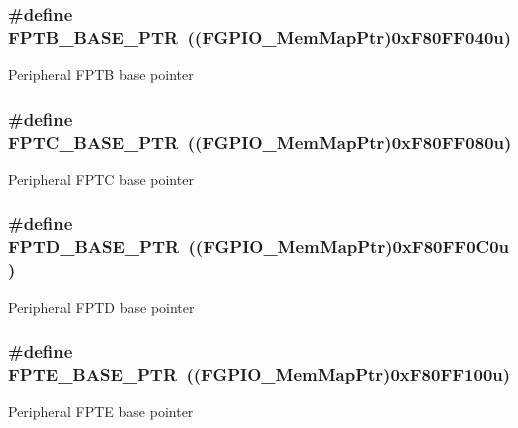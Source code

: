 \subsubsection[{F\+P\+T\+B\+\_\+\+B\+A\+S\+E\+\_\+\+P\+T\+R}]{\setlength{\rightskip}{0pt plus 5cm}\#define F\+P\+T\+B\+\_\+\+B\+A\+S\+E\+\_\+\+P\+T\+R~(({\bf F\+G\+P\+I\+O\+\_\+\+Mem\+Map\+Ptr})0x\+F80\+F\+F040u)}\label{group___f_g_p_i_o___peripheral_ga725ec21a43213bffe0aa484f7406bcf5}
Peripheral F\+P\+T\+B base pointer \hypertarget{group___f_g_p_i_o___peripheral_gaed3b8398ebed63795f9ce57eb9a59097}{}
\subsubsection[{F\+P\+T\+C\+\_\+\+B\+A\+S\+E\+\_\+\+P\+T\+R}]{\setlength{\rightskip}{0pt plus 5cm}\#define F\+P\+T\+C\+\_\+\+B\+A\+S\+E\+\_\+\+P\+T\+R~(({\bf F\+G\+P\+I\+O\+\_\+\+Mem\+Map\+Ptr})0x\+F80\+F\+F080u)}\label{group___f_g_p_i_o___peripheral_gaed3b8398ebed63795f9ce57eb9a59097}
Peripheral F\+P\+T\+C base pointer \hypertarget{group___f_g_p_i_o___peripheral_gabaff6b055edb9ba703415d0473b92ca8}{}
\subsubsection[{F\+P\+T\+D\+\_\+\+B\+A\+S\+E\+\_\+\+P\+T\+R}]{\setlength{\rightskip}{0pt plus 5cm}\#define F\+P\+T\+D\+\_\+\+B\+A\+S\+E\+\_\+\+P\+T\+R~(({\bf F\+G\+P\+I\+O\+\_\+\+Mem\+Map\+Ptr})0x\+F80\+F\+F0\+C0u)}\label{group___f_g_p_i_o___peripheral_gabaff6b055edb9ba703415d0473b92ca8}
Peripheral F\+P\+T\+D base pointer \hypertarget{group___f_g_p_i_o___peripheral_ga191ce600c147c06111ecea5b3b0aa6fb}{}
\subsubsection[{F\+P\+T\+E\+\_\+\+B\+A\+S\+E\+\_\+\+P\+T\+R}]{\setlength{\rightskip}{0pt plus 5cm}\#define F\+P\+T\+E\+\_\+\+B\+A\+S\+E\+\_\+\+P\+T\+R~(({\bf F\+G\+P\+I\+O\+\_\+\+Mem\+Map\+Ptr})0x\+F80\+F\+F100u)}\label{group___f_g_p_i_o___peripheral_ga191ce600c147c06111ecea5b3b0aa6fb}
Peripheral F\+P\+T\+E base pointer 

